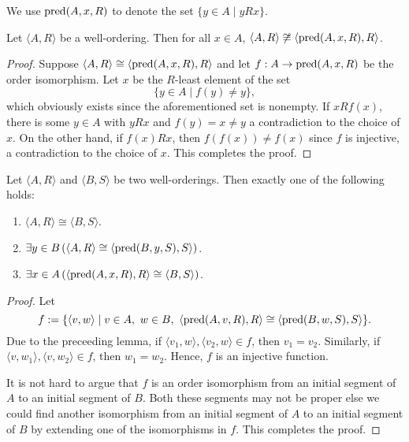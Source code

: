 We use $\operatorname{pred}(A,x,R)$ to denote the set $\{y\in A\mid y R x\}$.

\begin{lemma}
    Let $\langle A, R\rangle$ be a well-ordering. Then for all $x\in A$, $\langle A, R\rangle\not\cong\langle\operatorname{pred}(A,x,R), R\rangle$.
\end{lemma}
\begin{proof}
    Suppose $\langle A, R\rangle\cong\langle\operatorname{pred}(A,x,R), R\rangle$ and let $f: A\to \operatorname{pred}(A,x,R)$ be the order isomorphism. Let $x$ be the $R$-least element of the set 
    \begin{equation*}
        \{y\in A\mid f(y)\ne y\},
    \end{equation*}
    which obviously exists since the aforementioned set is nonempty. If $x R f(x)$, there is some $y\in A$ with $y R x$ and $f(y) = x\ne y$ a contradiction to the choice of $x$. On the other hand, if $f(x) R x$, then $f(f(x))\ne f(x)$ since $f$ is injective, a contradiction to the choice of $x$. This completes the proof.
\end{proof}

\begin{theorem}
    Let $\langle A, R\rangle$ and $\langle B, S\rangle$ be two well-orderings. Then exactly one of the following holds: 
    \begin{enumerate}[label=(\alph*)]
        \item $\langle A, R\rangle\cong\langle B, S\rangle$.
        \item $\exists y\in B\left(\langle A, R\rangle\cong\langle\operatorname{pred}(B,y,S), S\rangle\right)$.
        \item $\exists x\in A\left(\langle\operatorname{pred}(A,x,R), R\rangle\cong\langle B, S\rangle\right)$.
    \end{enumerate}
\end{theorem}
\begin{proof}
    Let 
    \begin{equation*}
        f := \{\langle v, w\rangle\mid v\in A,~w\in B,~\langle\operatorname{pred}(A,v,R), R\rangle\cong\langle\operatorname{pred}(B,w,S), S\rangle\}.
    \end{equation*}
    Due to the preceeding lemma, if $\langle v_1,w\rangle, \langle v_2,w\rangle\in f$, then $v_1 = v_2$. Similarly, if $\langle v,w_1\rangle, \langle v,w_2\rangle\in f$, then $w_1 = w_2$. Hence, $f$ is an injective function.

    It is not hard to argue that $f$ is an order isomorphism from an initial segment of $A$ to an initial segment of $B$. Both these segments may not be proper else we could find another isomorphism from an initial segment of $A$ to an initial segment of $B$ by extending one of the isomorphisms in $f$. This completes the proof.
\end{proof}